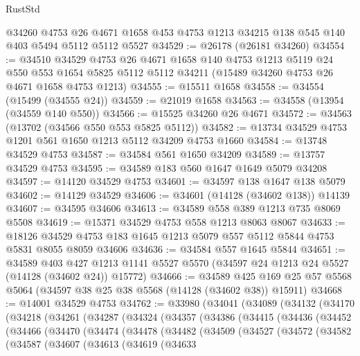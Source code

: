 \begin{lexlean}{RustStd}
\begin{coremodule}
    @34260
    @4753
    @26
    @4671
    @1658
    @453
    @4753
    @1213
    @34215
    @138
    @545
    @140
    @403
    @5494
    @5112
    @5112
    @5527
@34529 := @26178 (@26181 @34260)
@34554 := @34510
    @34529
    @4753
    @26
    @4671
    @1658
    @140
    @4753
    @1213
    @5119
    @24
    @550
    @553
    @1654
    @5825
    @5112
    @5112
    @34211
    (@15489 @34260 @4753 @26 @4671 @1658 @4753 @1213)
@34555 := @15511 @1658
@34558 := @34554 (@15499 (@34555 @24))
@34559 := @21019 @1658
@34563 := @34558 (@13954 (@34559 @140 @550))
@34566 := @15525 @34260 @26 @4671
@34572 := @34563 (@13702 (@34566 @550 @553 @5825 @5112))
@34582 := @13734 @34529 @4753 @1201 @561 @1650 @1213 @5112 @34209 @4753 @1660
@34584 := @13748 @34529 @4753
@34587 := @34584 @561 @1650 @34209
@34589 := @13757 @34529 @4753
@34595 := @34589 @183 @560 @1647 @1649 @5079 @34208
@34597 := @14120 @34529 @4753
@34601 := @34597 @138 @1647 @138 @5079
@34602 := @14129 @34529
@34606 := @34601 (@14128 (@34602 @138)) @14139
@34607 := @34595 @34606
@34613 := @34589 @558 @389 @1213 @735 @8069 @5508
@34619 := @15371 @34529 @4753 @558 @1213 @8063 @8067
@34633 := @18126 @34529 @4753 @183 @1645 @1213 @5079 @557 @5112 @5844 @4753 @5831 @8055 @8059 @34606
@34636 := @34584 @557 @1645 @5844
@34651 := @34589
    @403
    @427
    @1213
    @1141
    @5527
    @5570
    (@34597 @24 @1213 @24 @5527 (@14128 (@34602 @24)) @15772)
@34666 := @34589
    @425
    @169
    @25
    @57
    @5568
    @5064
    (@34597 @38 @25 @38 @5568 (@14128 (@34602 @38)) @15911)
@34668 := @14001 @34529 @4753
@34762 := @33980
    (@34041
      (@34089
        (@34132
          (@34170
            (@34218
              (@34261
                (@34287
                  (@34324
                    (@34357
                      (@34386
                        (@34415
                          (@34436
                            (@34452
                              (@34466
                                (@34470
                                  (@34474
                                    (@34478
                                      (@34482
                                        (@34509
                                          (@34527
                                            (@34572
                                              (@34582
                                                (@34587
                                                  (@34607
                                                    (@34613
                                                      (@34619
                                                        (@34633

\end{coremodule}
\end{lexlean}
